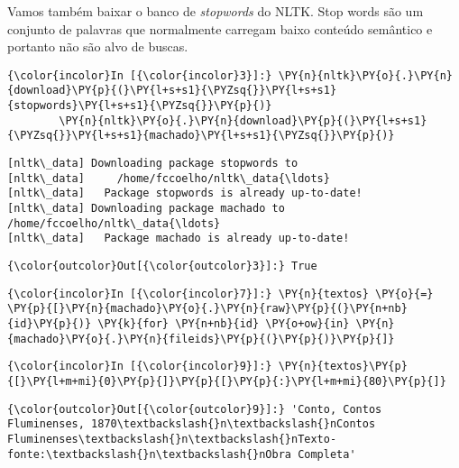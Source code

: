     Vamos também baixar o banco de \emph{stopwords} do NLTK. Stop words são
um conjunto de palavras que normalmente carregam baixo conteúdo
semântico e portanto não são alvo de buscas.

    \begin{Verbatim}[commandchars=\\\{\}]
{\color{incolor}In [{\color{incolor}3}]:} \PY{n}{nltk}\PY{o}{.}\PY{n}{download}\PY{p}{(}\PY{l+s+s1}{\PYZsq{}}\PY{l+s+s1}{stopwords}\PY{l+s+s1}{\PYZsq{}}\PY{p}{)}
        \PY{n}{nltk}\PY{o}{.}\PY{n}{download}\PY{p}{(}\PY{l+s+s1}{\PYZsq{}}\PY{l+s+s1}{machado}\PY{l+s+s1}{\PYZsq{}}\PY{p}{)}
\end{Verbatim}

    \begin{Verbatim}[commandchars=\\\{\}]
[nltk\_data] Downloading package stopwords to
[nltk\_data]     /home/fccoelho/nltk\_data{\ldots}
[nltk\_data]   Package stopwords is already up-to-date!
[nltk\_data] Downloading package machado to /home/fccoelho/nltk\_data{\ldots}
[nltk\_data]   Package machado is already up-to-date!

    \end{Verbatim}

            \begin{Verbatim}[commandchars=\\\{\}]
{\color{outcolor}Out[{\color{outcolor}3}]:} True
\end{Verbatim}
        
    \begin{Verbatim}[commandchars=\\\{\}]
{\color{incolor}In [{\color{incolor}7}]:} \PY{n}{textos} \PY{o}{=} \PY{p}{[}\PY{n}{machado}\PY{o}{.}\PY{n}{raw}\PY{p}{(}\PY{n+nb}{id}\PY{p}{)} \PY{k}{for} \PY{n+nb}{id} \PY{o+ow}{in} \PY{n}{machado}\PY{o}{.}\PY{n}{fileids}\PY{p}{(}\PY{p}{)}\PY{p}{]}
\end{Verbatim}

    \begin{Verbatim}[commandchars=\\\{\}]
{\color{incolor}In [{\color{incolor}9}]:} \PY{n}{textos}\PY{p}{[}\PY{l+m+mi}{0}\PY{p}{]}\PY{p}{[}\PY{p}{:}\PY{l+m+mi}{80}\PY{p}{]}
\end{Verbatim}

            \begin{Verbatim}[commandchars=\\\{\}]
{\color{outcolor}Out[{\color{outcolor}9}]:} 'Conto, Contos Fluminenses, 1870\textbackslash{}n\textbackslash{}nContos Fluminenses\textbackslash{}n\textbackslash{}nTexto-fonte:\textbackslash{}n\textbackslash{}nObra Completa'
\end{Verbatim}
        
